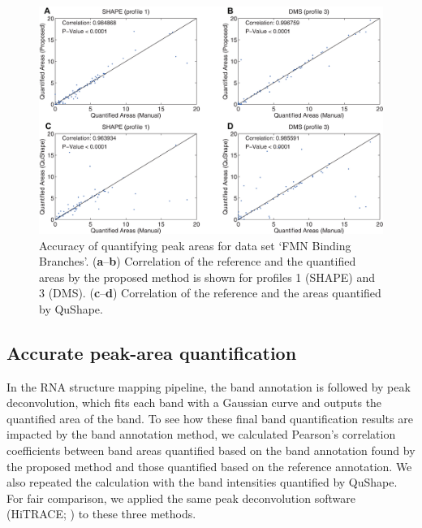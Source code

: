 \begin{figure}
\centering
\includegraphics[width=0.9\linewidth]{figures/result_peak_area5}
\caption{Accuracy of quantifying peak areas for data set `FMN Binding Branches'. (\textbf{a}--\textbf{b}) Correlation of the reference and the quantified areas by the proposed method is shown for profiles 1 (SHAPE) and 3 (DMS). (\textbf{c}--\textbf{d}) Correlation of the reference and the areas quantified by QuShape.
}
\label{f:peak-area}
\end{figure}

\subsection{Accurate peak-area quantification}\label{ss:peak-area}
In the RNA structure mapping pipeline, the band annotation is followed by peak deconvolution, which fits each band with a Gaussian curve and outputs the quantified area of the band. To see how these final band quantification results are impacted by the band annotation method, we calculated Pearson's correlation coefficients between band areas quantified based on the band annotation found by the proposed method and those quantified based on the reference annotation. We also repeated the calculation with the band intensities quantified by QuShape. For fair comparison, we applied the same peak deconvolution software (HiTRACE; \citealp{Yoon2011}) to these three methods.

